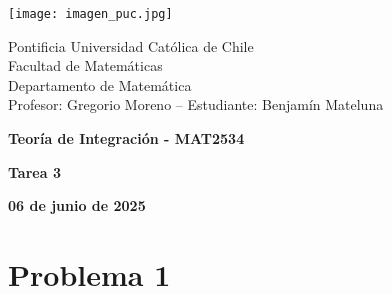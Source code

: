 \documentclass{article}
\begin{document}
\begin{minipage}{2.5cm}
    \texttt{[image: imagen\_puc.jpg]}
\end{minipage}
\begin{minipage}{14cm}
    {\sc Pontificia Universidad Católica de Chile\\
    Facultad de Matemáticas\\
    Departamento de Matemática\\
    Profesor: Gregorio Moreno -- Estudiante: Benjamín Mateluna}
\end{minipage}
\vspace{1ex}

{\centerline{\bf Teoría de Integración - MAT2534}
\centerline{\bf Tarea 3}}
\centerline{\bf 06 de junio de 2025}

\section*{Problema 1}
\end{document}
